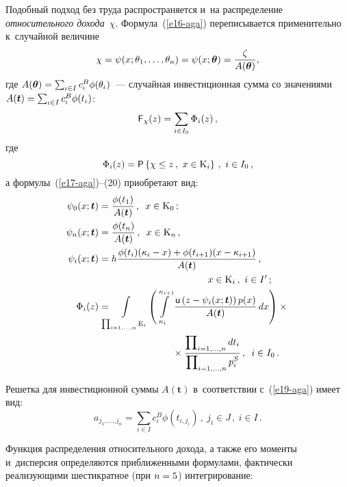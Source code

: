 \begin{multicols}{2}
  Подобный подход без труда распространяется и~на распределение 
\textit{относительного дохода}~$\chi$. Формула~(\ref{e16-aga}) 
переписывается применительно к~случайной величине 
$$
\chi = \psi(x; \theta_1, 
\ldots , \theta_n) = \psi(x; \boldsymbol{\theta}) = 
\displaystyle\frac{\displaystyle \zeta\mathstrut}{\displaystyle A(\boldsymbol{\theta})\mathstrut},
$$
 где $A(\boldsymbol{\theta}) \hm= 
\sum\nolimits_{\iota\in I} c_{\iota}^B\phi(\theta_{\iota})$~--- случайная инвестиционная 
сумма со значениями $A(\boldsymbol{t}) \hm= \sum\nolimits_{\iota \in I} 
c_{\iota}^B \phi(t_{\iota})$:
  \begin{equation}
  {\sf F}_\chi(z)=\sum\limits_{i\in I_0} \Phi_i(z)\,,
    \label{e21-aga}
    \end{equation}
    где
    $$
   \Phi_i(z)={\sf P}\left\{ \chi\leq 
z\,,\ x\in \mathrm{K}_i\right\}\,,\
 i\in I_0\,,
$$
а формулы~(\ref{e17-aga})--(20) приобретают вид: 
\begin{align*}
\psi_0(x; \boldsymbol{t}) &=\fr{\phi(t_1)}{A(\boldsymbol{t})}\,,\enskip  x\in 
\mathrm{K}_0\,;\\
\psi_n(x; \boldsymbol{t}) &=\fr{\phi(t_n)}{A(\boldsymbol{t})}\,,\enskip 
x\in \mathrm{K}_n\,,\\
\psi_i(x; \boldsymbol{t})&=h \fr{\phi(t_i) (\kappa_i-x) +\phi(t_{i+1}) (x-
\kappa_{i+1})} {A(\boldsymbol{t})}\,,\\
& \hspace*{40mm}x\in \mathrm{K}_i\,,\ i\in I^\prime\,;\\
  \Phi_i(z)&=\!\!\!\!\!\int\limits_{\prod\nolimits_{i=1,\ldots , n} \mathrm{E}_i} \! \left( 
\int\limits_{\kappa_i}^{\kappa_{i+1}} \fr{{\sf u}\left( z-\psi_i(x; 
\boldsymbol{t})\right) p(x)}{A(\boldsymbol{t})}\,dx \right) \times{}\\
&\hspace*{27mm}{}\times
\fr{\prod\nolimits_{i=1,\ldots , n} dt_i}{\prod\nolimits_{i=1,\ldots , n} p_i^S}\,,\enskip i\in 
I_0\,.
  \end{align*}
  
  Решетка для инвестиционной суммы $A(\boldsymbol{t})$ в~соответствии 
с~(\ref{e19-aga}) имеет вид:
  $$
  a_{j_1,\ldots , j_n}=\sum\limits_{\iota\in I}
   c_\iota^B \phi\left(t_{\iota,j_\iota}\right)\,,\
  j_i\in J\,,\ i\in I\,.
  $$
  
  Функция распределения относительного дохода, а также его моменты 
и~дисперсия определяются приближенными формулами, фактически 
реализующими шестикратное (при $n \hm= 5$) интегрирование:


\end{multicols}
